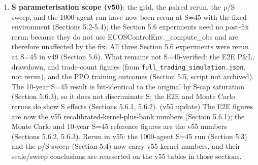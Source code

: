 \documentclass[11pt]{article}
\begin{document}
\begin{enumerate}
\item \textbf{S parameterisation scope (v50)}: the grid, the paired rerun, the p/S sweep, and the 1000-agent run have now been rerun at S=45 with the fixed environment (Sections 5.2-5.4); the Section 5.6 experiments need no post-fix rerun because they do not use ECOSControlEnv.\_compute\_obs and are therefore unaffected by the fix. All three Section 5.6 experiments were rerun at S=45 in v49 (Section 5.6). What remains not S=45-verified: the E2E P\&L, drawdown, and trade-count figures (from \texttt{full\_trading\_simulation.json}, not rerun), and the PPO training outcomes (Section 5.5, script not archived). The 10-year S=45 result is bit-identical to the original by S-cap saturation (Section 5.6.3), so it does not discriminate S; the E2E and Monte Carlo reruns do show S effects (Sections 5.6.1, 5.6.2). (v55 update) The E2E figures are now the v55 recalibrated-kernel-plus-bank numbers (Section 5.6.1); the Monte Carlo and 10-year S=45 reference figures are the v55 numbers (Sections 5.6.2, 5.6.3). Rerun in v55: the 1000-agent S=45 run (Section 5.3) and the p/S sweep (Section 5.4) now carry v55-kernel numbers, and their scale/sweep conclusions are reasserted on the v55 tables in those sections.

\end{enumerate}
\end{document}
